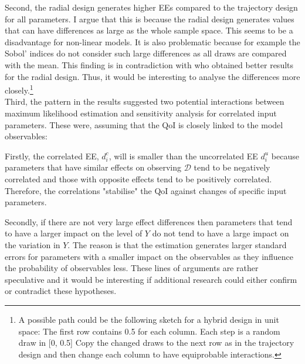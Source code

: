\noindent
Second, the radial design generates higher EEs compared to the trajectory design for all parameters. I argue that this is because the radial design generates values that can have differences as large as the whole sample space. This seems to be a disadvantage for non-linear models. It is also problematic because for example the Sobol' indices do not consider such large differences as all draws are compared with the mean. This finding is in contradiction with \cite{campolongo2007effective} who obtained better results for the radial design. Thus, it would be interesting to analyse the differences more closely.\footnote{A possible path could be the following sketch for a hybrid design in unit space: The first row contains 0.5 for each column. Each step is a random draw in [0, 0.5] Copy the changed draws to the next row as in the trajectory design and then change each column to have equiprobable interactions.}\\

\noindent
Third, the pattern in the results suggested two potential interactions between maximum likelihood estimation and sensitivity analysis for correlated input parameters. These were, assuming that the QoI is closely linked to the model observables:

Firstly, the correlated EE, $d_i^{c}$, will is smaller than the uncorrelated EE $d_i^{u}$ because parameters that have similar effects on observing $\pmb{\mathcal{D}}$ tend to be negatively correlated and those with opposite effects tend to be positively correlated. Therefore, the correlations "stabilise" the QoI against changes of specific input parameters.

Secondly, if there are not very large effect differences then parameters that tend to have a larger impact on the level of $Y$ do not tend to have a large impact on the variation in $Y$. The reason is that the estimation generates larger standard errors for parameters with a smaller impact on the observables as they influence the probability of observables less. These lines of arguments are rather speculative and it would be interesting if additional research could either confirm or contradict these hypotheses.

